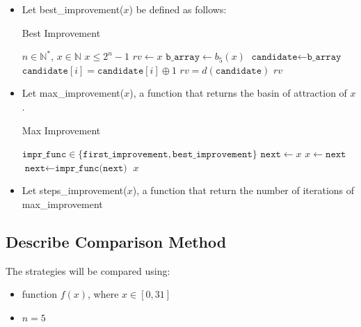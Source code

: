 \documentclass{article}
\begin{document}
\begin{itemize}
    \newpage
    \item Let best\_improvement($x$) be defined as follows:
        \begin{algorithm}
        \caption{Best Improvement}\label{alg:cap}
        \begin{algorithmic}
        \Require $n \in \mathbb{N}^*$, $x \in \mathbb{N}$
        \Ensure $x \leq 2^n-1$
            \State $rv \gets x$
            \State $\texttt{b\_array} \gets b_5(x)$
                \State $\texttt{candidate} \gets \texttt{b\_array}$
                \State $\texttt{candidate}[i] = \texttt{candidate}[i] \oplus 1$ 
                    \State $rv = d(\texttt{candidate})$
                \EndIf
            \EndFor
            \State \Return $rv$
        \EndFunction
        \end{algorithmic}
        \end{algorithm}
        
    \item Let max\_improvement($x$), a function that returns the basin of attraction of $x$.
    
        \begin{algorithm}
        \caption{Max Improvement}\label{alg:cap}
        \begin{algorithmic}
        \Require $\texttt{impr\_func} \in \{\texttt{first\_improvement}, \texttt{best\_improvement}\}$
            \State $\texttt{next} \gets x$
                \State $x \gets \texttt{next}$
                \State $\texttt{next} \gets \texttt{impr\_func(next)}$
            \EndWhile
            \State \Return $x$
        \EndFunction
        \end{algorithmic}
        \end{algorithm}
        
    \item Let steps\_improvement($x$), a function that return the number of iterations of max\_improvement

\end{itemize}

\newpage
\subsection{Describe Comparison Method}
The strategies will be compared using:
\begin{itemize}
    \item function $f(x)$, where $x \in [0, 31]$
    \item $n = 5$
\end{itemize}
\end{document}
